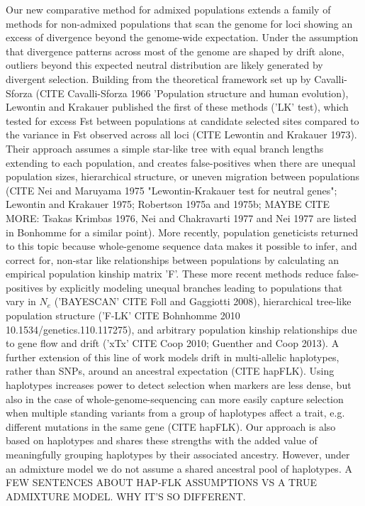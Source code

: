 \documentclass[12pt]{report}
\begin{document}
Our new comparative method for admixed populations extends a family of methods for non-admixed populations that scan the genome for loci showing an excess of divergence beyond the genome-wide expectation. Under the assumption that divergence patterns across most of the genome are shaped by drift alone, outliers beyond this expected neutral distribution are likely generated by divergent selection. Building from the theoretical framework set up by Cavalli-Sforza (CITE Cavalli-Sforza 1966 'Population structure and human evolution), Lewontin and Krakauer published the first of these methods ('LK' test), which tested for excess Fst between populations at candidate selected sites compared to the variance in Fst observed across all loci (CITE Lewontin and Krakauer 1973). Their approach assumes a simple star-like tree with equal branch lengths extending to each population, and creates false-positives when there are unequal population sizes, hierarchical structure, or uneven migration between populations (CITE Nei and Maruyama 1975 "Lewontin-Krakauer test for neutral genes"; Lewontin and Krakauer 1975; Robertson 1975a and 1975b; MAYBE CITE MORE: Tsakas Krimbas 1976, Nei and Chakravarti 1977 and Nei 1977 are listed in Bonhomme for a similar point). More recently, population geneticists returned to this topic because whole-genome sequence data makes it possible to infer, and correct for, non-star like relationships between populations by calculating an empirical population kinship matrix 'F'. 
These more recent methods reduce false-positives by explicitly modeling unequal branches leading to populations that vary in $N_{e}$ ('BAYESCAN' CITE Foll and Gaggiotti 2008), hierarchical tree-like population structure ('F-LK' CITE Bohnhomme 2010 10.1534/genetics.110.117275), and arbitrary population kinship relationships due to gene flow and drift ('xTx' CITE Coop 2010;  Guenther and Coop 2013). A further extension of this line of work models drift in multi-allelic haplotypes, rather than SNPs, around an ancestral expectation (CITE hapFLK). Using haplotypes increases power to detect selection when markers are less dense, but also in the case of whole-genome-sequencing can more easily capture selection when multiple standing variants from a group of haplotypes affect a trait, e.g. different mutations in the same gene (CITE hapFLK). Our approach is also based on haplotypes and shares these strengths with the added value of meaningfully grouping haplotypes by their associated ancestry. However, under an admixture model we do not assume a shared ancestral pool of haplotypes.
A FEW SENTENCES ABOUT HAP-FLK ASSUMPTIONS VS A TRUE ADMIXTURE MODEL. WHY IT'S SO DIFFERENT.
\end{document}
